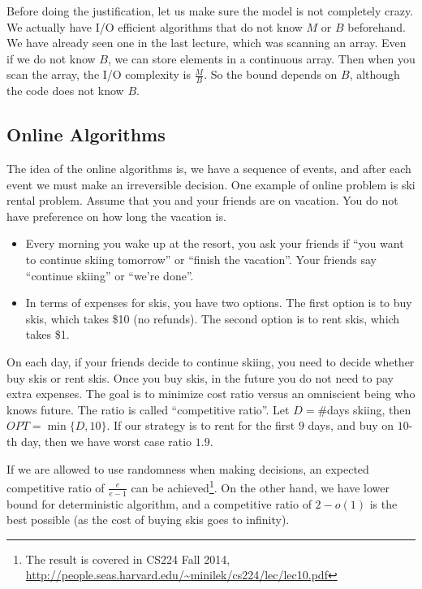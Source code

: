 \documentclass[11pt]{article}
\begin{document}
Before doing the justification, let us make sure the model is not completely crazy. We actually have I/O efficient algorithms that do not know $M$ or $B$ beforehand. We have already seen one in the last lecture, which was scanning an array. Even if we do not know $B$, we can store elements in a continuous array. Then when you scan the array, the I/O complexity is $\frac{M}{B}$. So the bound depends on $B$, although the code does not know $B$. 

\subsection{Online Algorithms}

The idea of the online algorithms is, we have a sequence of events, and after each event we must make an irreversible decision.
One example of online problem is ski rental problem. Assume that you and your friends are on vacation. You do not have preference on how long the vacation is.  

\begin{itemize}
\item Every morning you wake up at the resort, you ask your friends if ``you want to continue skiing tomorrow'' or ``finish the vacation''. Your friends say ``continue skiing'' or ``we're done''.
\item In terms of expenses for skis, you have two options. The first option is to buy skis, which takes \$10 (no refunds). The second option is to rent skis, which takes \$1. 
\end{itemize}

On each day, if your friends decide to continue skiing, you need to decide whether buy skis or rent skis. Once you buy skis, in the future you do not need to pay extra expenses. The goal is to minimize cost ratio versus an omniscient being who knows future. The ratio is called ``competitive ratio''. Let $D=$\#days skiing, then $OPT=\min\{D,10\}$. If our strategy is to rent for the first $9$ days, and buy on $10$-th day, then we have worst case ratio $1.9$. 

If we are allowed to use randomness when making decisions, an expected competitive ratio of $\frac{e}{e-1}$ can be achieved\footnote{The result is covered in CS224 Fall 2014, \url{http://people.seas.harvard.edu/~minilek/cs224/lec/lec10.pdf}}. On the other hand, we have lower bound for deterministic algorithm, and a competitive ratio of $2-o(1)$ is the best possible (as the cost of buying skis goes to infinity).
\end{document}
